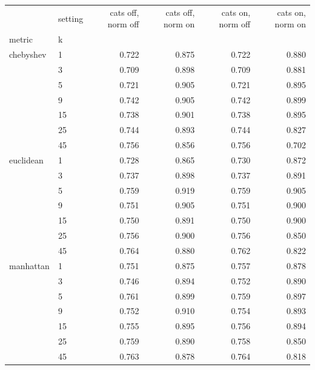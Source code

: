\begin{tabular}{llrrrr}
\toprule
 & setting & cats off, norm off & cats off, norm on & cats on, norm off & cats on, norm on \\
metric & k &  &  &  &  \\
\midrule
chebyshev & 1 & 0.722 & 0.875 & 0.722 & 0.880 \\
 & 3 & 0.709 & 0.898 & 0.709 & 0.881 \\
 & 5 & 0.721 & 0.905 & 0.721 & 0.895 \\
 & 9 & 0.742 & 0.905 & 0.742 & 0.899 \\
 & 15 & 0.738 & 0.901 & 0.738 & 0.895 \\
 & 25 & 0.744 & 0.893 & 0.744 & 0.827 \\
 & 45 & 0.756 & 0.856 & 0.756 & 0.702 \\
euclidean & 1 & 0.728 & 0.865 & 0.730 & 0.872 \\
 & 3 & 0.737 & 0.898 & 0.737 & 0.891 \\
 & 5 & 0.759 & 0.919 & 0.759 & 0.905 \\
 & 9 & 0.751 & 0.905 & 0.751 & 0.900 \\
 & 15 & 0.750 & 0.891 & 0.750 & 0.900 \\
 & 25 & 0.756 & 0.900 & 0.756 & 0.850 \\
 & 45 & 0.764 & 0.880 & 0.762 & 0.822 \\
manhattan & 1 & 0.751 & 0.875 & 0.757 & 0.878 \\
 & 3 & 0.746 & 0.894 & 0.752 & 0.890 \\
 & 5 & 0.761 & 0.899 & 0.759 & 0.897 \\
 & 9 & 0.752 & 0.910 & 0.754 & 0.893 \\
 & 15 & 0.755 & 0.895 & 0.756 & 0.894 \\
 & 25 & 0.759 & 0.890 & 0.758 & 0.850 \\
 & 45 & 0.763 & 0.878 & 0.764 & 0.818 \\
\bottomrule
\end{tabular}
